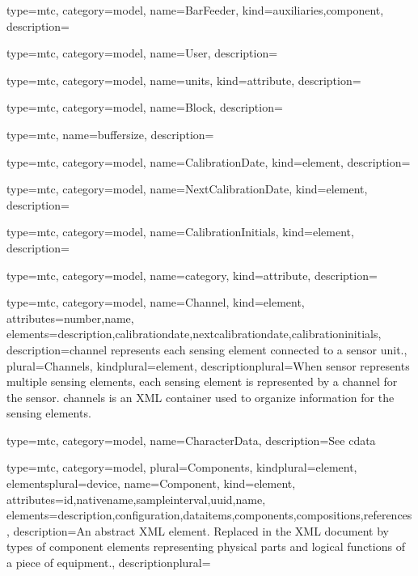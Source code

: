 {
  type=mtc,
  category=model,
  name={BarFeeder},
  kind={auxiliaries,component},
  description={}
}


{
  type=mtc,
  category=model,
  name={User},
  description={}
}


{
  type=mtc,
  category=model,
  name={units},
  kind={attribute},
  description={}
}


{
  type=mtc,
  category=model,
  name={Block},
  description={}
}


{
  type=mtc,
  name=buffersize,
  description={}
}


{
  type=mtc,
  category=model,
  name={CalibrationDate},
  kind={element},
  description={}
}


{
  type=mtc,
  category=model,
  name={NextCalibrationDate},
  kind={element},
  description={}
}


{
  type=mtc,
  category=model,
  name={CalibrationInitials},
  kind={element},
  description={}
}


{
  type=mtc,
  category=model,
  name={category},
  kind={attribute},
  description={}
}


{
  type=mtc,
  category=model,
  name={Channel},
  kind={element},
  attributes={\gls{number},\gls{name}},
  elements={\gls{description},\gls{calibrationdate},\gls{nextcalibrationdate},\gls{calibrationinitials}},
  description={\gls{channel} represents each \gls{sensing element} connected to a \gls{sensor unit}.},
  plural={Channels},
  kindplural={element},
  descriptionplural={When \gls{sensor} represents multiple \glspl{sensing element}, each \gls{sensing element} is represented by a \gls{channel} for the \gls{sensor}. \glspl{channel} is an XML container used to organize information for the \glspl{sensing element}. }
}


{
  type=mtc,
  category=model,
  name={CharacterData},
  description={See \gls{cdata}}
}



{
  type=mtc,
  category=model,
  plural={Components},
  kindplural={element},
  elementsplural={\gls{device}},
  name={Component},
  kind={element},
  attributes={\gls{id},\gls{nativename},\gls{sampleinterval},\gls{uuid},\gls{name}},
  elements={\gls{description},\gls{configuration},\glspl{dataitem},\glspl{component},\glspl{composition},\glspl{reference}},
  description={An abstract XML element. Replaced in the XML document by types of \gls{component} elements representing physical parts and logical functions of a piece of equipment.},
  descriptionplural={} 
}


